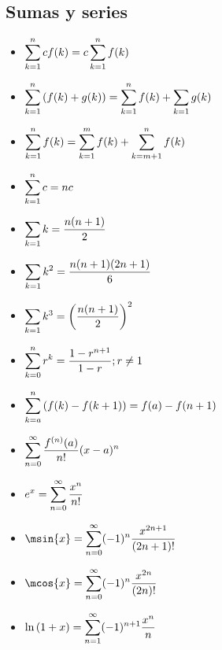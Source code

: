 \subsection{Sumas y series}
\begin{itemize}
	\item $\displaystyle\sum_{k = 1}^{n}cf(k) = c\sum_{k = 1}^{n}f(k)$
	\item $\displaystyle\sum_{k = 1}^{n}\left( f(k) + g(k) \right) =\sum_{k = 1}^{n}f(k) +\sum_{k = 1}g(k)$
	\item $\displaystyle\sum_{k = 1}^{n}f(k) =\sum_{k = 1}^{m}f(k) +\sum_{k = m + 1}^{n}f(k)$
	\item $\displaystyle\sum_{k = 1}^{n}c =nc$
	\item $\displaystyle\sum_{k = 1}k =\dfrac{n(n + 1)}{2}$
	\item $\displaystyle\sum_{k = 1}k^{2} =\dfrac{n(n + 1)(2n + 1)}{6}$
	\item $\displaystyle\sum_{k = 1}k^{3} =\left( \dfrac{n(n + 1)}{2} \right)^{2}$
	\item $\displaystyle\sum_{k = 0}^{n}r^{k} =\dfrac{1 - r^{n + 1}}{1 - r} ; r\neq 1$
	\item $\displaystyle\sum_{k = a}^{n}\left( f(k) - f(k + 1) \right) = f(a) - f(n + 1)$
	\item $\displaystyle\sum_{n = 0}^{\infty}\dfrac{f^{(n)}(a)}{n!}(x - a)^{n}$
	\item $\displaystyle e^{x} =\sum_{n = 0}^{\infty}\dfrac{x^{n}}{n!}$
	\item $\ds\msin{x} =\sum_{n = 0}^{\infty}(-1)^{n}\dfrac{x^{2n + 1}}{(2n + 1)!}$
	\item $\ds\mcos{x} =\sum_{n = 0}^{\infty}(-1)^{n}\dfrac{x^{2n}}{(2n)!}$
	\item $\ds\mln{1 + x} =\sum_{n = 1}^{\infty}(-1)^{n + 1}\dfrac{x^{n}}{n}$
\end{itemize}
